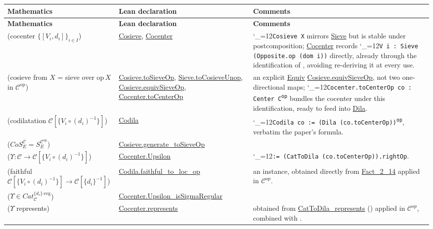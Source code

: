 \documentclass[11pt]{amsart}
\newcommand{\lc}[1]{\url{#1}}
\newcommand{\lcode}{\begingroup\catcode`\_=12\relax\lcodeInner}
\newcommand{\lcodeInner}[1]{\texttt{#1}\endgroup}
\theoremstyle{plain}
\theoremstyle{definition}
\theoremstyle{remark}
\newcommand{\calC}{\mathcal C}
\newcommand{\op}{\ensuremath{\mathrm{op}}}
\begin{document}
\begingroup
\renewcommand{\arraystretch}{1.15}
\begin{longtable}{@{}p{2.55cm}p{4.1cm}p{4.75cm}@{}}
\toprule
\textbf{Mathematics} & \textbf{Lean declaration} & \textbf{Comments} \\
\midrule
\endfirsthead
\toprule
\textbf{Mathematics} & \textbf{Lean declaration} & \textbf{Comments} \\
\midrule
\endhead
\bottomrule
\endfoot
\citep[Definition~4.1]{Mayeux} (cocenter $\{[V_i,d_i]\}_{i\in I}$) & \lc{Cosieve}, \lc{Cocenter} & \lcode{Cosieve X} mirrors \lc{Sieve} but is stable under postcomposition; \lc{Cocenter} records \lcode{V i : Sieve (Opposite.op (dom i))} directly, already through the identification of \citep[Fact~4.2]{Mayeux}, avoiding re-deriving it at every use. \\
\citep[Fact~4.2]{Mayeux} (cosieve from $X$ = sieve over $\mathrm{op}\,X$ in $\calC^{\op}$) & \lc{Cosieve.toSieveOp}, \lc{Sieve.toCosieveUnop}, \lc{Cosieve.equivSieveOp}, \lc{Cocenter.toCenterOp} & an explicit \lc{Equiv} \lc{Cosieve.equivSieveOp}, not two one-directional maps; \lcode{Cocenter.toCenterOp co : Center C\textsuperscript{op}} bundles the cocenter under this identification, ready to feed into \lc{Dila}. \\
\citep[Definition~4.3]{Mayeux} (codilatation $\calC[\{V_i\circ(d_i)^{-1}\}]$) & \lc{Codila} & \lcode{Codila co := (Dila (co.toCenterOp))\textsuperscript{op}}, verbatim the paper's formula. \\
\citep[Fact~4.4]{Mayeux} ($CoS^\calC_E = S^{\calC^{op}}_E$) & \lc{Cosieve.generate_toSieveOp} & \\
\citep[Proposition~4.5(i)]{Mayeux} ($\Upsilon : \calC \to \calC[\{V_i\circ(d_i)^{-1}\}]$) & \lc{Cocenter.Upsilon} & \lcode{:= (CatToDila (co.toCenterOp)).rightOp}. \\
\citep[Proposition~4.5(ii)]{Mayeux} (faithful $\calC[\{V_i\circ(d_i)^{-1}\}] \to \calC[\{d_i\}^{-1}]$) & \lc{Codila.faithful_to_loc_op} & an instance, obtained directly from \lc{Fact_2_14} applied in $\calC^{op}$. \\
\citep[Proposition~4.5(iii)]{Mayeux} ($\Upsilon \in Cat_\calC^{\{d_i\}\text{-reg}}$) & \lc{Cocenter.Upsilon_isSigmaRegular} & \\
\citep[Proposition~4.5(iv)]{Mayeux} ($\Upsilon$ represents) & \lc{Cocenter.represents} & obtained from \lc{CatToDila_represents} (\citep[Proposition~3.12]{Mayeux}) applied in $\calC^{op}$, combined with \citep[Fact~4.4]{Mayeux}. \\
\end{longtable}
\endgroup
\end{document}

